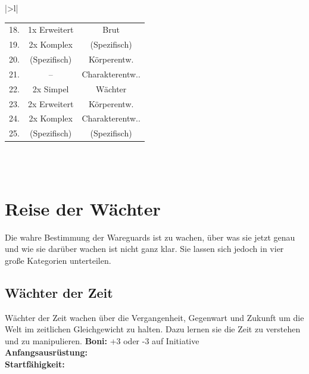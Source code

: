 \begin{table}[h!]
\begin{tabular}{|>{}l|}
\begin{tabular}{c|c|c}
            \rowcolor{mydarkblue} 18. & 1x Erweitert & Brut \\
            \rowcolor{myred} 19. & 2x Komplex & (Spezifisch)\\
            \rowcolor{mydarkblue} 20. & (Spezifisch) & Körperentw.\\
            \rowcolor{myred} 21. & -- & Charakterentw..\\
            \rowcolor{mydarkblue} 22. & 2x Simpel & Wächter\\
            \rowcolor{myred} 23. & 2x Erweitert & Körperentw.\\
            \rowcolor{mydarkblue} 24. & 2x Komplex & Charakterentw..\\
            \rowcolor{myred} 25. & (Spezifisch) & (Spezifisch) \\
        \end{tabular}\\
        \\
        \btrule{1pt}
    \end{tabular}
\end{table}

\section*{Reise der Wächter}
Die wahre Bestimmung der Wareguards ist zu wachen, über was sie jetzt genau und wie sie darüber wachen ist nicht ganz klar. Sie lassen sich jedoch in vier große Kategorien unterteilen.

\subsection*{Wächter der Zeit}
Wächter der Zeit wachen über die Vergangenheit, Gegenwart und Zukunft um die Welt im zeitlichen Gleichgewicht zu halten. Dazu lernen sie die Zeit zu verstehen und zu manipulieren.
\textbf{Boni:}  +3 oder -3 auf Initiative\\
\textbf{Anfangsausrüstung:} \\
\textbf{Startfähigkeit:}  \\

